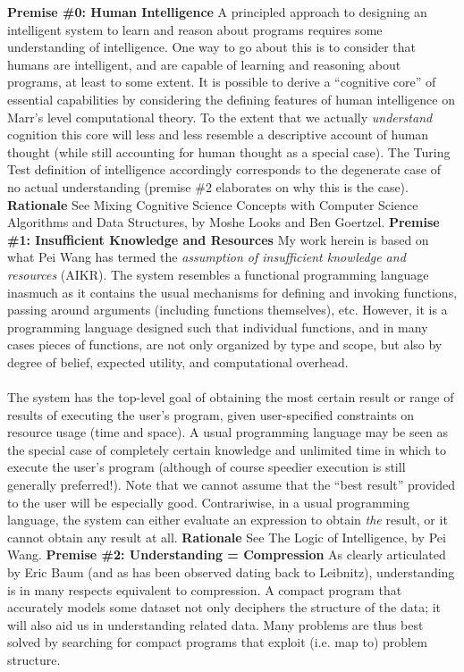 \documentclass[twoside,11pt]{article}
\begin{document}
\textbf{Premise \#0: Human Intelligence}
 A principled approach to designing an intelligent system to learn and reason about programs requires some understanding of intelligence. One way to go about this is to consider that humans are intelligent, and are capable of learning and reasoning about programs, at least to some extent. It is possible to derive a ``cognitive core'' of essential capabilities by considering the defining features of human intelligence on Marr's level computational theory. To the extent that we actually \emph{understand}
 cognition this core will less and less resemble a descriptive account of human thought (while still accounting for human thought as a special case). The Turing Test definition of intelligence accordingly corresponds to the degenerate case of no actual understanding (premise \#2 elaborates on why this is the case). \textbf{Rationale}
 See Mixing Cognitive Science Concepts with Computer Science Algorithms and Data Structures, by Moshe Looks and Ben Goertzel. \textbf{Premise \#1: Insufficient Knowledge and Resources}
 My work herein is based on what Pei Wang has termed the \emph{assumption of insufficient knowledge and resources}
 (AIKR). The system resembles a functional programming language inasmuch as it contains the usual mechanisms for defining and invoking functions, passing around arguments (including functions themselves), etc. However, it is a programming language designed such that individual functions, and in many cases pieces of functions, are not only organized by type and scope, but also by degree of belief, expected utility, and computational overhead.\\ 
\\ 
 The system has the top-level goal of obtaining the most certain result or range of results of executing the user's program, given user-specified constraints on resource usage (time and space). A usual programming language may be seen as the special case of completely certain knowledge and unlimited time in which to execute the user's program (although of course speedier execution is still generally preferred!). Note that we cannot assume that the ``best result'' provided to the user will be especially good. Contrariwise, in a usual programming language, the system can either evaluate an expression to obtain \emph{the}
 result, or it cannot obtain any result at all. \textbf{Rationale}
 See The Logic of Intelligence, by Pei Wang. \textbf{Premise \#2: Understanding = Compression}
 As clearly articulated by Eric Baum (and as has been observed dating back to Leibnitz), understanding is in many respects equivalent to compression. A compact program that accurately models some dataset not only deciphers the structure of the data; it will also aid us in understanding related data. Many problems are thus best solved by searching for compact programs that exploit (i.e. map to) problem structure.\\ 
\end{document}
